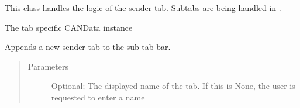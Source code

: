 \documentclass[letterpaper,10pt,english]{sphinxmanual}
\begin{document}
\begin{fulllineitems}
\label{\detokenize{src:src.SenderTab.SenderTab}}
This class handles the logic of the sender tab.
Subtabs are being handled in {\hyperref[\detokenize{src:src.SenderTabElement.SenderTabElement}]{}}.

\begin{fulllineitems}
\label{\detokenize{src:src.SenderTab.SenderTab.CANData}}
The tab specific CANData instance

\end{fulllineitems}


\begin{fulllineitems}
\label{\detokenize{src:src.SenderTab.SenderTab.active}}
\end{fulllineitems}


\begin{fulllineitems}
\label{\detokenize{src:src.SenderTab.SenderTab.addSender}}
Appends a new sender tab to the sub tab bar.
\begin{quote}\begin{description}
\item[{Parameters}] \leavevmode
{} \textendash{} Optional; The displayed name of the tab.
If this is None, the user is requested to enter a name

\end{description}\end{quote}

\end{fulllineitems}



\end{fulllineitems}
\end{document}
